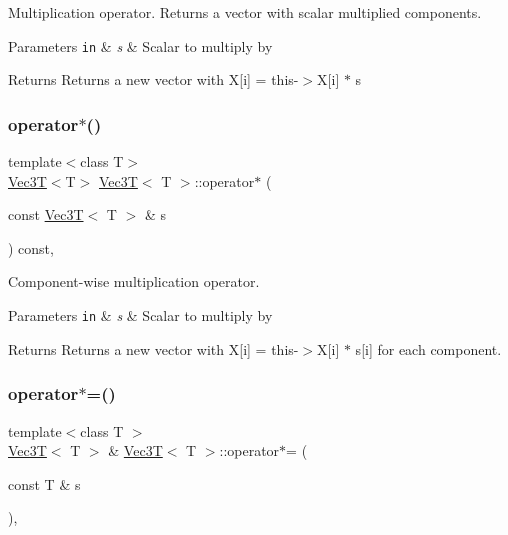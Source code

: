 Multiplication operator. Returns a vector with scalar multiplied components. 


\begin{DoxyParams}[1]{Parameters}
\mbox{\tt in}  & {\em s} & Scalar to multiply by \\
\hline
\end{DoxyParams}
\begin{DoxyReturn}{Returns}
Returns a new vector with X\mbox{[}i\mbox{]} = this-\/$>$X\mbox{[}i\mbox{]} $\ast$ s 
\end{DoxyReturn}
\mbox{\label{classVec3T_a579db6fb2bed30b3f024d1a017d7a124}} 
\subsubsection{\texorpdfstring{operator$\ast$()}{operator*()}\hspace{0.1cm}{\footnotesize\ttfamily [2/2]}}
{\footnotesize\ttfamily template$<$class T$>$ \\
\hyperlink{classVec3T}{Vec3T}$<$T$>$ \hyperlink{classVec3T}{Vec3T}$<$ T $>$\+::operator$\ast$ (\begin{DoxyParamCaption}\item[{const \hyperlink{classVec3T}{Vec3T}$<$ T $>$ \&}]{s }\end{DoxyParamCaption}) const\hspace{0.3cm}{\ttfamily [inline]}, {\ttfamily [noexcept]}}



Component-\/wise multiplication operator. 


\begin{DoxyParams}[1]{Parameters}
\mbox{\tt in}  & {\em s} & Scalar to multiply by \\
\hline
\end{DoxyParams}
\begin{DoxyReturn}{Returns}
Returns a new vector with X\mbox{[}i\mbox{]} = this-\/$>$X\mbox{[}i\mbox{]} $\ast$ s\mbox{[}i\mbox{]} for each component. 
\end{DoxyReturn}
\mbox{\label{classVec3T_a0448e51b7f785b14df47092929cb73a3}} 
\subsubsection{\texorpdfstring{operator$\ast$=()}{operator*=()}}
{\footnotesize\ttfamily template$<$class T $>$ \\
\hyperlink{classVec3T}{Vec3T}$<$ T $>$ \& \hyperlink{classVec3T}{Vec3T}$<$ T $>$\+::operator$\ast$= (\begin{DoxyParamCaption}\item[{const T \&}]{s }\end{DoxyParamCaption})\hspace{0.3cm}{\ttfamily [inline]}, {\ttfamily [noexcept]}}



